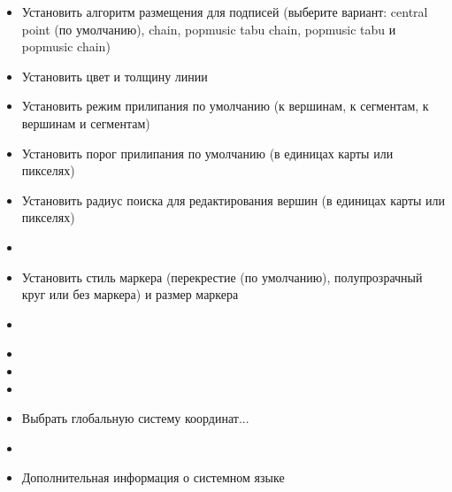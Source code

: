 
\begin{itemize}
\item Установить алгоритм размещения для подписей (выберите вариант: central
point (по умолчанию), chain, popmusic tabu chain, popmusic tabu и
popmusic chain)
\end{itemize}


\begin{itemize}
\item Установить цвет и толщину линии
\item Установить режим прилипания по умолчанию (к вершинам, к сегментам,
к вершинам и сегментам)
\item Установить порог прилипания по умолчанию (в единицах карты или
пикселях)
\item Установить радиус поиска для редактирования вершин (в единицах
карты или пикселях)
\item {}
\item Установить стиль маркера (перекрестие (по умолчанию), полупрозрачный
круг или без маркера) и размер маркера
\item {}
\end{itemize}


\begin{itemize}
\item {}
\item {}
\item {}
\item Выбрать глобальную систему координат...
\end{itemize}


\begin{itemize}
\item {}
\item Дополнительная информация о системном языке
\end{itemize}


